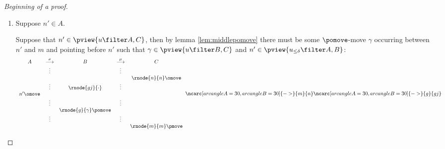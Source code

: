 \begin{proof}[Beginning of a proof]
\begin{enumerate}[I.]
\begin{enumerate}
\begin{enumerate}
\item Suppose $\alpha \in C$ then $\beta\in C$ (since $\alpha$ is an O-move).

By instancing Lemma \ref{lem:interjump} with
$X\leftarrow B,C$ and $y,b,x,z \leftarrow \beta, n', \alpha, m$ we obtain that $n' \not\in\pview{u_{\prefixof m} \filter A,C}$.

\item Suppose $\alpha \in B$ then $\beta \in B$.

Now take the sequence $u_{\prefixof \alpha} \upharpoonright B, C$,
the following sequence shows the moves occurring between $\alpha$ and $\beta$ which  are relevant for the computation of the
O-view at $\alpha$:
$$u_{\prefixof \alpha} \upharpoonright B, C = \Pstr[0.1cm]{\cdots \stk\pmove{\beta} (o1)\omove \cdots (p1-o1)\pmove 
(o2)\omove \cdots (p2-o2)\pmove (o2)\omove \ \cdots\ 
\pmove  (ojump) \omove \cdots
(pjump-ojump) \pmove \omove
\cdots
\pmove (o4)\omove \cdots (p4-o4)\pmove \ \stk\omove{\alpha}
}$$



\ldots
\end{enumerate}


\item Suppose $n'\in A$. 

Suppose that $n' \in \pview{u\filter A,C}$, then by lemma \ref{lem:middlepomove}
there must be some $\pomove$-move $\gamma$ 
occurring between $n'$ and $m$ and pointing before $n'$
such that $\gamma \in \pview{u\filter B,C}$ and $n' \in \pview{u_{\leq \delta} \filter A,B}$:
$$ 
\begin{array}{ccccc}
A & \stackrel\sigma{\longrightarrow} & B & \stackrel\mu{\longrightarrow} & C \\
&\vdots&&\vdots\\
&&&& \rnode{n}{n}\omove \\
&\vdots&\rnode{gj}{\cdot}&\vdots\\
n' \omove \\
&\vdots&&\vdots  \\
&&\rnode{g}{\gamma} \pomove \\
&\vdots&&\vdots  \\
&&&&\rnode{m}{m} \pmove \\
\end{array}
\ncarc[arcangleA=30,arcangleB=30]{->}{m}{n}
\ncarc[arcangleA=30,arcangleB=30]{->}{g}{gj}
 $$  


\end{enumerate}
\end{enumerate}
\end{proof}
